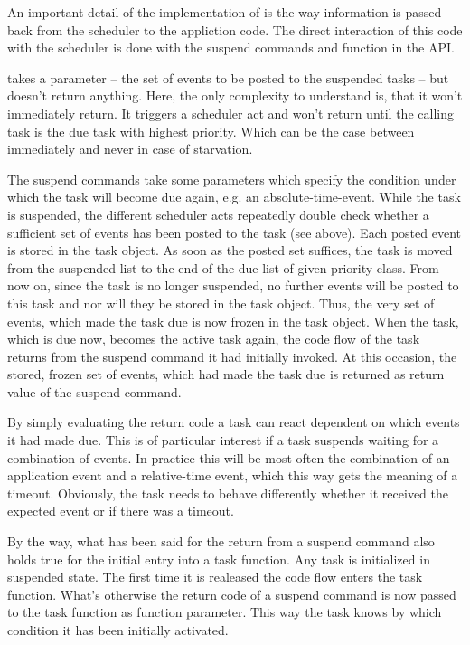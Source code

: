 An important detail of the implementation of \rtos{} is the way
information is passed back from the scheduler to the appliction code. The
direct interaction of this code with the scheduler is done with the
suspend commands and function  in the \rtos{} API.

 takes a parameter -- the set of events to be posted to
the suspended tasks -- but doesn't return anything. Here, the only
complexity to understand is, that it won't immediately return. It triggers
a scheduler act and won't return until the calling task is the due task
with highest priority. Which can be the case between immediately and never
in case of starvation.

The suspend commands take some parameters which specify the condition
under which the task will become due again, e.g. an absolute-time-event.
While the task is suspended, the different scheduler acts repeatedly double
check whether a sufficient set of events has been posted to the task (see
above). Each posted event is stored in the task object. As soon as the
posted set suffices, the task is moved from the suspended list to the end
of the due list of given priority class. From now on, since the task is no
longer suspended, no further events will be posted to this task and nor
will they be stored in the task object. Thus, the very set of events, which
made the task due is now frozen in the task object. When the task, which
is due now, becomes the active task again, the code flow of the task
returns from the suspend command it had initially invoked. At this
occasion, the stored, frozen set of events, which had made the task due is
returned as return value of the suspend command.

By simply evaluating the return code a task can react dependent on which
events it had made due. This is of particular interest if a task suspends
waiting for a combination of events. In practice this will be most often
the combination of an application event and a relative-time event, which
this way gets the meaning of a timeout. Obviously, the task needs to
behave differently whether it received the expected event or if there was
a timeout.

By the way, what has been said for the return from a suspend command also
holds true for the initial entry into a task function. Any task is
initialized in suspended state. The first time it is realeased the code
flow enters the task function. What's otherwise the return code of a
suspend command is now passed to the task function as function parameter.
This way the task knows by which condition it has been initially
activated.

